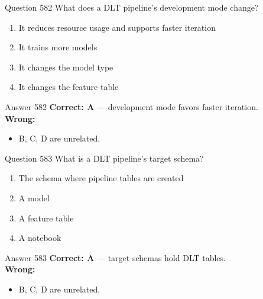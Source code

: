\documentclass[aspectratio=169,11pt]{beamer}
\begin{document}
	\begin{frame}{Question 582}
		What does a DLT pipeline's development mode change?
		\begin{enumerate}[label=\Alph*.]
			\item It reduces resource usage and supports faster iteration
			\item It trains more models
			\item It changes the model type
			\item It changes the feature table
		\end{enumerate}
	\end{frame}
	\begin{frame}{Answer 582}
		\textbf{Correct: A} --- development mode favors faster iteration.\\
		\vspace{0.5em}
		\textbf{Wrong:}
		\begin{itemize}
			\item B, C, D are unrelated.
		\end{itemize}
	\end{frame}
	
	\begin{frame}{Question 583}
		What is a DLT pipeline's target schema?
		\begin{enumerate}[label=\Alph*.]
			\item The schema where pipeline tables are created
			\item A model
			\item A feature table
			\item A notebook
		\end{enumerate}
	\end{frame}
	\begin{frame}{Answer 583}
		\textbf{Correct: A} --- target schemas hold DLT tables.\\
		\vspace{0.5em}
		\textbf{Wrong:}
		\begin{itemize}
			\item B, C, D are unrelated.
		\end{itemize}
	\end{frame}
	
\end{document}
